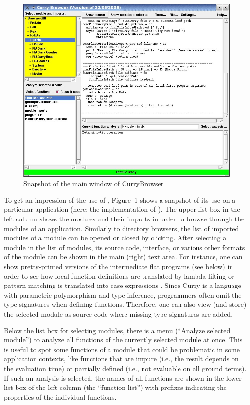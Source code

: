 \begin{figure}[t]
\begin{center}
\includegraphics[scale=0.7]{currybrowser.jpg}
\end{center}
\caption{Snapshot of the main window of CurryBrowser\label{fig-currybrowser}}
\end{figure}
%
To get an impression of the use of \cb, Figure~\ref{fig-currybrowser}
shows a snapshot of its use on a particular application
(here: the implementation of \cb).
The upper list box in the left column shows the modules and their imports
in order to browse through the modules of an application.
Similarly to directory browsers, the list of imported modules of a module
can be opened or closed by clicking.
After selecting a module in the list of modules, its source code,
interface, or various other formats of the module can be shown
in the main (right) text area. For instance, one can show
pretty-printed versions of the intermediate flat programs (see below)
in order to see how local function definitions are translated by lambda lifting
\cite{Johnsson85}
or pattern matching is translated into case expressions \cite{Hanus97POPL,Wadler87}.
Since Curry is a language with parametric polymorphism and type inference,
programmers often omit the type signatures when defining functions.
Therefore, one can also view (and store) the selected module as source code where
missing type signatures are added.

Below the list box for selecting modules, there is a menu
(``Analyze selected module'') to analyze all functions
of the currently selected module at once. This is useful
to spot some functions of a module that could be problematic
in some application contexts, like functions that are impure (i.e., the result
depends on the evaluation time) or partially defined (i.e.,
not evaluable on all ground terms).
If such an analysis is selected,
the names of all functions are shown in the
lower list box of the left column (the ``function list'')
with prefixes indicating the properties of the individual functions.

